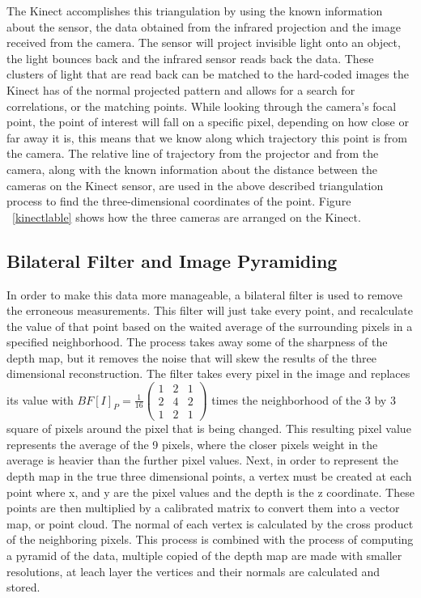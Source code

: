 \documentclass[pdftex,10.5pt]{report}
\begin{document}
The Kinect accomplishes this triangulation by using the known information about the sensor, the data obtained from the infrared projection and the image received from the camera. The sensor will project invisible light onto an object, the light bounces back and the infrared sensor reads back the data. These clusters of light that are read back can be matched to the hard-coded images the Kinect has of the normal projected pattern and allows for a search for correlations, or the matching points. While looking through the camera's focal point, the point of interest will fall on a specific pixel, depending on how close or far away it is, this means that we know along which trajectory this point is from the camera. The relative line of trajectory from the projector and from the camera, along with the known information about the distance between the cameras on the Kinect sensor, are used in the above described triangulation process to find the three-dimensional coordinates of the point. Figure ~\ref{kinectlable} shows how the three cameras are arranged on the Kinect.

\subsection{Bilateral Filter and Image Pyramiding}
In order to make this data more manageable, a bilateral filter is used to remove the erroneous measurements. This filter will just take every point, and recalculate the value of that point based on the waited average of the surrounding pixels in a specified neighborhood. The process takes away some of the sharpness of the depth map, but it removes the noise that will skew the results of the three dimensional reconstruction. The filter takes every pixel in the image and replaces its value with $BF[I]_{P} = \frac{1}{16} \left( \begin{array}{ccc}
1 & 2 & 1 \\
2 & 4 & 2 \\
1 & 2 & 1 \end{array}  \right) $ times the neighborhood of the 3 by 3 square of pixels around the pixel that is being changed. This resulting pixel value represents the average of the 9 pixels, where the closer pixels weight in the average is heavier than the further pixel values. Next, in order to represent the depth map in the true three dimensional points, a vertex must be created at each point where x, and y are the pixel values and the depth is the z coordinate. These points are then multiplied by a calibrated matrix to convert them into a vector map, or point cloud. The normal of each vertex is calculated by the cross product of the neighboring pixels. This process is combined with the process of computing a pyramid of the data, multiple copied of the depth map are made with smaller resolutions, at leach layer the vertices and their normals are calculated and stored. 
\end{document}
